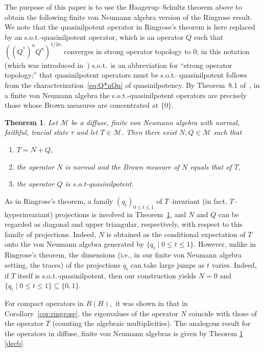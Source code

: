 \documentclass{amsart}
\theoremstyle{plain}
\newtheorem{thm}{Theorem}
\theoremstyle{remark}
\begin{document}
The purpose of this paper is to use the Haagerup--Schultz theorem above to obtain the following
finite von Neumann algebra version of the Ringrose result.
We note that the quasinilpotent operator in Ringrose's theorem is here replaced by an s.o.t.-quasinilpotent operator, which is
an operator $Q$ such that $((Q^*)^nQ^n)^{1/2n}$ converges in strong operator topology to $0$;
in this notation (which was introduced in~\cite{DFS}) s.o.t.\ is an abbreviation for ``strong operator topology;''
that quasinilpotent operators must be s.o.t.--quasinilpotent follows from the characterization~\eqref{eq:Q*nQn}
of quasinilpotency.
By Theorem~8.1 of~\cite{HS2}, in a finite von Neumann algebra the s.o.t.-quasinilpotent operators are precisely those whose
Brown measures are concentrated at $\{0\}$.
\begin{thm}\label{decomposition} Let $\mathcal{M}$ be a diffuse, finite von Neumann algebra with
normal, faithful, tracial state $\tau$ and let $T\in\mathcal{M}$.
Then there exist $N,Q\in\mathcal{M}$ such that
\begin{enumerate}[{\rm (a)}]
\item\label{deca} $T=N+Q$,
\item\label{decb} the operator $N$ is normal and the Brown measure of $N$ equals that of $T$,
\item\label{decc} the operator $Q$ is s.o.t-quasinilpotent.
\end{enumerate}
\end{thm}

As in Ringrose's theorem, a family $(q_t)_{0\le t\le 1}$ of $T$--invariant (in fact, $T$--hyper\-in\-vari\-ant) projections
is involved in Theorem~\ref{decomposition}, and $N$ and $Q$ can be regarded as diagonal and upper triangular, respectively,
with respect to this family of projections.
Indeed, $N$ is obtained as the conditional expectation of $T$ onto the von Neumann algebra generated by $\{q_t\mid 0\le t\le 1\}$.
However, unlike in Ringrose's theorem, the dimensions (i.e., in our finite von Neumann algebra setting, the traces)
of the projections $q_t$ can take large jumps as $t$ varies.
Indeed, if $T$ itself is s.o.t.-quasinilpotent, then our construction yields $N=0$ and $\{q_t\mid 0\le t\le 1\}\subseteq\{0,1\}$.

\medskip

For compact operators in $B(H),$ it was shown in \cite{Ringrose} that in Corollary~\ref{cor:ringrose},
the eigenvalues of the operator $N$ coincide with those of the operator $T$ (counting the algebraic multiplicities). The analogous result for the operators in diffuse, finite von Neumann algebras is given by Theorem \ref{decomposition} \eqref{decb}. 
\end{document}
